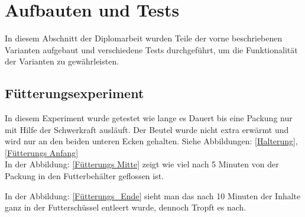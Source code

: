 \section{Aufbauten und Tests}

In diesem Abschnitt der Diplomarbeit wurden Teile der vorne beschriebenen Varianten aufgebaut und verschiedene Tests durchgeführt, um die Funktionalität der Varianten zu gewährleisten. \\

\subsection{Fütterungsexperiment} 

In diesem Experiment wurde getestet wie lange es Dauert bis eine Packung nur mit Hilfe der Schwerkraft ausläuft. Der Beutel wurde nicht extra erwärmt und wird nur an den beiden unteren Ecken gehalten. Siehe Abbildungen: \ref{Halterung}, \ref{Fütterungs Anfang} \\

In der Abbildung: \ref{Fütterungs Mitte} zeigt wie viel nach 5 Minuten von der Packung in den Futterbehälter geflossen ist.

In der Abbildung: \ref{Fütterungs_Ende} sieht man das nach 10 Minuten der Inhalte ganz in der Futterschüssel entleert wurde, dennoch Tropft es nach.


